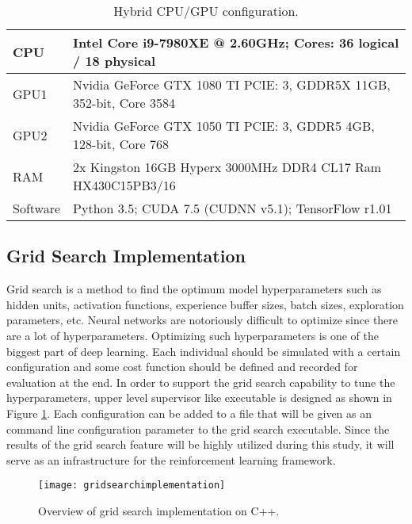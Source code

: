 \documentclass{ituphdreport}
\begin{document}
\begin{table}
	\centering
	\begin{tabular}{ll} 
		\hline
		CPU      & Intel Core i9-7980XE @ 2.60GHz; Cores: 36 logical / 18 physical  \\
		\hline
		GPU1      & Nvidia GeForce GTX 1080 TI PCIE: 3, GDDR5X 11GB, 352-bit, Core 3584            \\ 
		\hline
		GPU2      & Nvidia GeForce GTX 1050 TI PCIE: 3, GDDR5 4GB, 128-bit, Core 768            \\ 		
		\hline
		RAM      & 2x Kingston 16GB Hyperx 3000MHz DDR4 CL17 Ram HX430C15PB3/16  \\
		\hline			
		Software & Python 3.5; CUDA 7.5 (CUDNN v5.1); TensorFlow r1.01          \\ 
		\hline		
	\end{tabular}
	\caption{Hybrid CPU/GPU configuration.
	\label{table:hybridsystem}}
\end{table}



\subsection{Grid Search Implementation} \label{sec:gridsearchimplementation}
Grid search is a method to find the optimum model hyperparameters such as hidden units, activation functions, experience buffer sizes, batch sizes, exploration parameters, etc. Neural networks are notoriously difficult to optimize since there are a lot of hyperparameters. Optimizing such hyperparameters is one of the biggest part of deep learning. Each individual should be simulated with a certain configuration and some cost function should be defined and recorded for evaluation at the end. In order to support the grid search capability to tune the hyperparameters, upper level supervisor like executable is designed as shown in Figure \ref{fig:gridsearchimplementation}. Each configuration can be added to a file that will be given as an command line configuration parameter to the grid search executable. Since the results of the grid search feature will be highly utilized during this study, it will serve as an infrastructure for the reinforcement learning framework. 

\begin{figure}[h]
	\begin{center}
		\texttt{[image: gridsearchimplementation]}
	\end{center}
	\caption{Overview of grid search implementation on C++.
		\label{fig:gridsearchimplementation}}
\end{figure}
\end{document}
